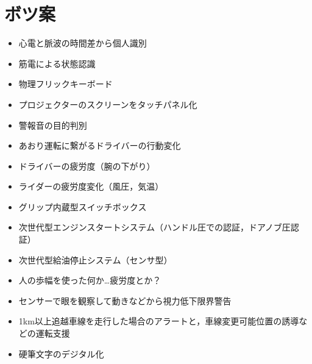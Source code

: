 \documentclass[a4j,twocolumn,10pt]{jarticle}
\begin{document}
\section{ボツ案}
\begin{itemize}
  \item 心電と脈波の時間差から個人識別
  \item 筋電による状態認識
  \item 物理フリックキーボード
  \item プロジェクターのスクリーンをタッチパネル化
  \item 警報音の目的判別
  \item あおり運転に繋がるドライバーの行動変化
  \item ドライバーの疲労度（腕の下がり）
  \item ライダーの疲労度変化（風圧，気温）
  \item グリップ内蔵型スイッチボックス
  \item 次世代型エンジンスタートシステム（ハンドル圧での認証，ドアノブ圧認証）
  \item 次世代型給油停止システム（センサ型）
  \item 人の歩幅を使った何か…疲労度とか？
  \item センサーで眼を観察して動きなどから視力低下限界警告
  \item 1km以上追越車線を走行した場合のアラートと，車線変更可能位置の誘導などの運転支援
  \item 硬筆文字のデジタル化
\end{itemize}

\end{document}
